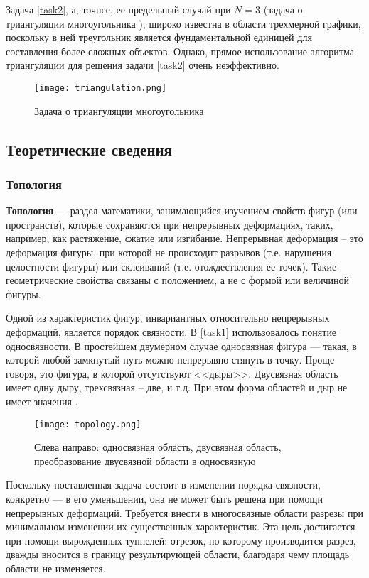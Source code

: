 Задача \ref{task2}, а, точнее, ее предельный случай при $N=3$ (задача о триангуляции многоугольника \cite{de_berg_chapter_2000}), широко известна в области трехмерной графики, поскольку в ней треугольник является фундаментальной единицей для составления более сложных объектов. Однако, прямое использование алгоритма триангуляции для решения задачи \ref{task2} очень неэффективно.

\begin{figure}[h]
    \centering
    \texttt{[image: triangulation.png]}
    \caption{Задача о триангуляции многоугольника}
\end{figure}

\subsection{Теоретические сведения}
\label{}

\subsubsection{Топология}
\label{}

\textbf{Топология} --- раздел математики, занимающийся изучением свойств фигур (или пространств), которые сохраняются при непрерывных деформациях, таких, например, как растяжение, сжатие или изгибание. Непрерывная деформация – это деформация фигуры, при которой не происходит разрывов (т.е. нарушения целостности фигуры) или склеиваний (т.е. отождествления ее точек). Такие геометрические свойства связаны с положением, а не с формой или величиной фигуры.

Одной из характеристик фигур, инвариантных относительно непрерывных деформаций, является порядок связности. В \ref{task1} использовалось понятие односвязности. В простейшем двумерном случае односвязная фигура --- такая, в которой любой замкнутый путь можно непрерывно стянуть в точку. Проще говоря, это фигура, в которой отсутствуют <<дыры>>. Двусвязная область имеет одну дыру, трехсвязная – две, и т.д. При этом форма областей и дыр не имеет значения \cite{__2012}.

\begin{figure}[h]
    \centering
    \texttt{[image: topology.png]}
    \caption{Слева направо: односвязная область, двусвязная область, преобразование двусвязной области в односвязную}
\end{figure}

Поскольку поставленная задача состоит в изменении порядка связности, конкретно --- в его уменьшении, она не может быть решена при помощи непрерывных деформаций. Требуется внести в многосвязные области разрезы при минимальном изменении их существенных характеристик. Эта цель достигается при помощи вырожденных туннелей: отрезок, по которому производится разрез, дважды вносится в границу результирующей области, благодаря чему площадь области не изменяется.

